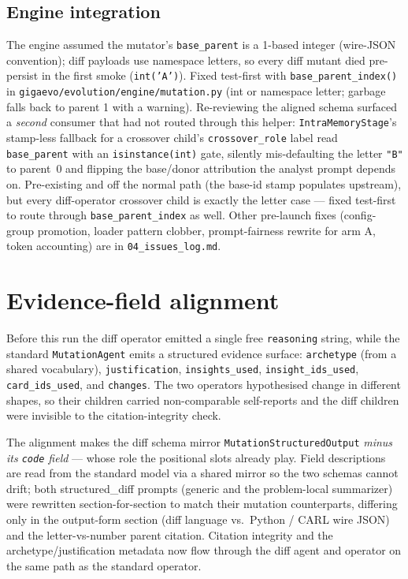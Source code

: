 \documentclass[11pt]{article}
\begin{document}
\subsection{Engine integration}
The engine assumed the mutator's \texttt{base\_parent} is a 1-based integer (wire-JSON
convention); diff payloads use namespace letters, so every diff mutant died pre-persist in
the first smoke (\texttt{int('A')}). Fixed test-first with \texttt{base\_parent\_index()} in
\texttt{gigaevo/evolution/engine/mutation.py} (int or namespace letter; garbage falls back to
parent 1 with a warning). Re-reviewing the aligned schema surfaced a \emph{second} consumer
that had not routed through this helper: \texttt{IntraMemoryStage}'s stamp-less fallback for
a crossover child's \texttt{crossover\_role} label read \texttt{base\_parent} with an
\texttt{isinstance(int)} gate, silently mis-defaulting the letter \texttt{"B"} to parent~0
and flipping the base/donor attribution the analyst prompt depends on. Pre-existing and off
the normal path (the base-id stamp populates upstream), but every diff-operator crossover
child is exactly the letter case --- fixed test-first to route through
\texttt{base\_parent\_index} as well. Other pre-launch fixes (config-group promotion, loader
pattern clobber, prompt-fairness rewrite for arm A, token accounting) are in
\texttt{04\_issues\_log.md}.

\section{Evidence-field alignment}
\label{sec:alignment}
Before this run the diff operator emitted a single free \texttt{reasoning} string, while the
standard \texttt{MutationAgent} emits a structured evidence surface:
\texttt{archetype} (from a shared vocabulary), \texttt{justification},
\texttt{insights\_used}, \texttt{insight\_ids\_used}, \texttt{card\_ids\_used}, and
\texttt{changes}. The two operators hypothesised change in different shapes, so their
children carried non-comparable self-reports and the diff children were invisible to the
citation-integrity check.

The alignment makes the diff schema mirror \texttt{MutationStructuredOutput} \emph{minus its
\texttt{code} field} --- whose role the positional slots already play. Field descriptions are
read from the standard model via a shared mirror so the two schemas cannot drift; both
structured\_diff prompts (generic and the problem-local summarizer) were rewritten
section-for-section to match their mutation counterparts, differing only in the output-form
section (diff language vs.\ Python / CARL wire JSON) and the letter-vs-number parent
citation. Citation integrity and the archetype/justification metadata now flow through the
diff agent and operator on the same path as the standard operator.
\end{document}
